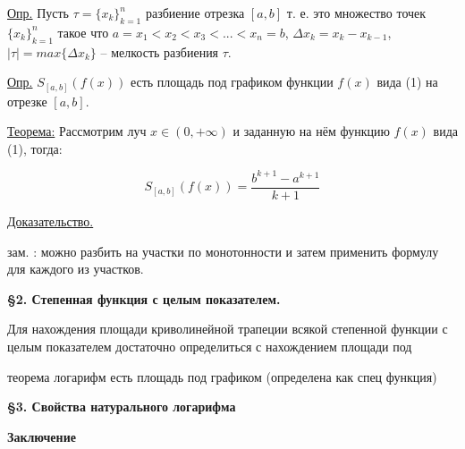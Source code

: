 \documentclass[a4paper,12pt]{article}
\begin{document}
	\quad \underline{Опр.} Пусть $\tau = \{x_k\}_{k=1}^{n}$ разбиение отрезка $[a, b]$ т. е. это множество точек $\{x_{k}\}_{k=1}^{n}$ такое что $a = x_1 < x_2 < x_3 < ... < x_n = b$, $\Delta x_k = x_k - x_{k-1}$, $|\tau| = max\{\Delta x_k\}$ -- мелкость разбиения $\tau$. 

	\quad \underline{Опр.} $S_{[a, b]} (f(x)) $ есть площадь под графиком функции $f(x)$ вида (1) на отрезке $[a, b]$. 
	
	\quad \underline{Теорема:} Рассмотрим луч $x\in(0, +\infty)$ и заданную на нём функцию $f(x)$ вида (1), тогда: 
	
	\begin{equation}
		S_{[a, b]} (f(x)) = \dfrac{b^{k+1} - a^{k+1}}{k+1}
	\end{equation}
	
	
	\quad \underline{Доказательство. }

	
	
	зам. : можно разбить на участки по монотонности и затем применить формулу для каждого из участков. 
	
	\quad \textbf{\S 2. Степенная функция с целым показателем. }
	
	\quad Для нахождения площади криволинейной трапеции всякой степенной функции с целым показателем достаточно определиться с нахождением площади под 
	
	теорема логарифм есть площадь под графиком (определена как спец функция)
	
	\quad \textbf{\S 3. Свойства натурального логарифма}
	
	\quad \textbf{Заключение}
	
\end{document}
